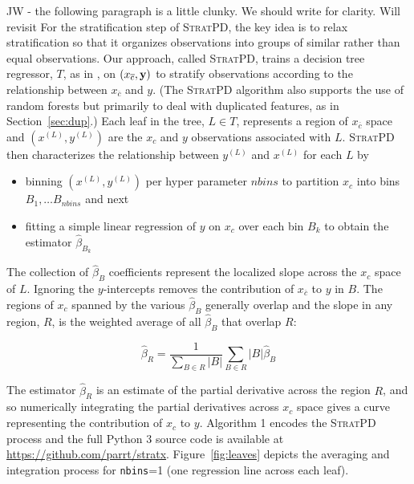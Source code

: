 \documentclass[12pt]{article}
\newcommand{\secref}[1]{Section~\ref{#1}}
\newcommand{\figref}[1]{Figure~\ref{#1}}
\newcommand{\spd}{\fontfamily{cmr}\textsc{\small StratPD}}
\newcommand{\xnc}{$x_{\overline{c}}$}
\begin{document}
{\color{red} JW - the following paragraph is a little clunky. We should write for clarity. Will revisit}
For the stratification step of \spd{}, the key idea is to relax stratification so that it organizes observations into groups of similar rather than equal observations. Our approach, called \spd, trains a decision tree regressor, $T$, as in \cite{CART}, on $(x_{\overline{c}}, {\bf y})$ to stratify observations according to the relationship between \xnc{} and $y$.  (The \spd{} algorithm also supports the use of random forests \cite{RF} but primarily to deal with duplicated features, as in \secref{sec:dup}.)  Each leaf in the tree, $L \in T$, represents a region of \xnc{} space and $(x^{(L)}, y^{(L)})$ are the $x_c$ and $y$ observations associated with $L$. \spd{} then characterizes the relationship between $y^{(L)}$ and $x^{(L)}$ for each $L$ by 
\begin{itemize}
	\item binning $(x^{(L)}, y^{(L)})$ per hyper parameter $nbins$ to partition $x_c$ into bins $B_1, \ldots B_{nbins}$ and next
	\item fitting a simple linear regression of $y$ on $x_c$ over each bin $B_k$ to obtain the estimator $\widehat{\beta}_{B_k}$
\end{itemize}

The collection of $\widehat{\beta}_{B}$ coefficients represent the localized slope across the $x_c$ space of $L$. Ignoring the $y$-intercepts removes the contribution of \xnc{} to $y$ in $B$. The regions of $x_c$ spanned by the various $\widehat{\beta}_{B}$ generally overlap and the slope in any region, $R$, is the weighted average of all $\widehat{\beta}_{B}$ that overlap $R$:

\begin{equation}\label{eq:slope}
\widehat{\beta}_R = \frac{1}{\displaystyle\sum_{B \in R} |B|}\displaystyle\sum_{B \in R}|B|\widehat{\beta}_{B}
\end{equation}

The estimator $\widehat{\beta}_R$ is an estimate of the partial derivative across the region $R$, and so numerically integrating the partial derivatives across $x_c$ space gives a curve representing the contribution of $x_c$ to $y$.  Algorithm 1 encodes the \spd{} process and the full Python 3 source code is available at {\small \url{https://github.com/parrt/stratx}}. \figref{fig:leaves} depicts the averaging and integration process for {\tt nbins}=1 (one regression line across each leaf).  
\end{document}
